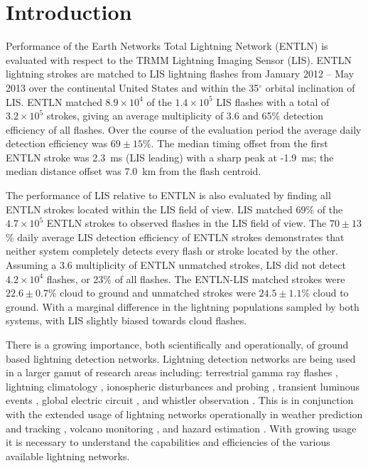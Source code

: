 \section{Introduction}

Performance of the Earth Networks Total Lightning Network (ENTLN) is evaluated with respect to the TRMM Lightning Imaging Sensor (LIS).
ENTLN lightning strokes are matched to LIS lightning flashes from January 2012 -- May 2013 over the continental United States and within the 35$^\circ$ orbital inclination of LIS.
ENTLN matched $8.9\times10^4$ of the $1.4\times10^5$ LIS flashes with a total of $3.2\times10^5$ strokes, giving an average multiplicity of 3.6 and 65\% detection efficiency of all flashes.
Over the course of the evaluation period the average daily detection efficiency was $69\pm15$\%.
The median timing offset from the first ENTLN stroke was 2.3~ms (LIS leading) with a sharp peak at -1.9~ms; the median distance offset was 7.0~km from the flash centroid.

The performance of LIS relative to ENTLN is also evaluated by finding all ENTLN strokes located within the LIS field of view.
LIS matched 69\% of the $4.7\times10^5$ ENTLN strokes to observed flashes in the LIS field of view.
The $70\pm13$\% daily average LIS detection efficiency of ENTLN strokes demonstrates that neither system completely detects every flash or stroke located by the other.
Assuming a 3.6 multiplicity of ENTLN unmatched strokes, LIS did not detect $4.2\times10^4$ flashes, or 23\% of all flashes.
The ENTLN-LIS matched strokes were $22.6\pm0.7$\% cloud to ground and unmatched strokes were $24.5\pm1.1$\% cloud to ground.
With a marginal difference in the lightning populations sampled by both systems, with LIS slightly biased towards cloud flashes.

There is a growing importance, both scientifically and operationally, of ground based lightning detection networks.
Lightning detection networks are being used in a larger gamut of research areas including: terrestrial gamma ray flashes \citep{Dwyer2012, Gjesteland2011, Connaughton2010}, lightning climatology \citep{Virts2013, Virts2011a, Burgesser2012}, ionospheric disturbances and probing \citep{Jacobson2010, Singh2011}, transient luminous events \citep{Soula2011}, global electric circuit  \citep{Holzworth2005}, and whistler observation \citep{Collier2010, Collier2011a, Burkholder2013}.
This is in conjunction with the extended usage of lightning networks operationally in weather prediction and tracking \citep{Fierro2012, Pan2010, Thomas2010d}, volcano monitoring \citep{Doughton2010}, and hazard estimation \citep{Altaratz2010}.
With growing usage it is necessary to understand the capabilities and efficiencies of the various available lightning networks.

